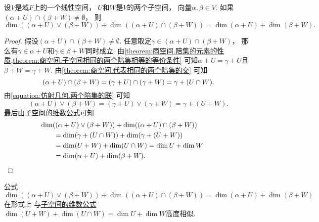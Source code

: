 \begin{theorem}
设\(V\)是域\(F\)上的一个线性空间，
\(U\)和\(W\)是\(V\)的两个子空间，
向量\(\alpha,\beta \in V\).
如果\((\alpha + U) \cap (\beta + W) \neq \emptyset\)，
则\begin{equation*}
	\dim((\alpha + U) \vee (\beta + W))
	+ \dim((\alpha + U) \cap (\beta + W))
	= \dim(\alpha + U)
	+ \dim(\beta + W).
\end{equation*}
\begin{proof}
假设\((\alpha + U) \cap (\beta + W) \neq \emptyset\).
任意取定\(\gamma \in (\alpha + U) \cap (\beta + W)\)，
那么有\(\gamma \in \alpha + U\)和\(\gamma \in \beta + W\)同时成立.
由\cref{theorem:商空间.陪集的元素的性质,theorem:商空间.子空间相同的两个陪集相等的等价条件}
可知\(\alpha + U = \gamma + U\)且\(\beta + W = \gamma + W\).
由\cref{theorem:商空间.代表相同的两个陪集的交}
可知\begin{equation*}
	(\alpha + U) \cap (\beta + W)
	= (\gamma + U) \cap (\gamma + W) \\
	= \gamma + (U \cap W).
\end{equation*}
由\cref{equation:仿射几何.两个陪集的联}
可知\begin{equation*}
	(\alpha + U) \vee (\beta + W)
	= (\gamma + U) \vee (\gamma + W)
	= \gamma + (U + W).
\end{equation*}
最后由\hyperref[theorem:线性空间.子空间.子空间的维数公式]{子空间的维数公式}可知\begin{align*}
	&\hspace{-20pt}
	\dim((\alpha + U) \vee (\beta + W))
		+ \dim((\alpha + U) \cap (\beta + W)) \\
	&= \dim(\gamma + (U \cap W))
		+ \dim(\gamma + (U + W)) \\
	&= \dim(U + W)
		+ \dim(U \cap W)
	= \dim U + \dim W \\
	&= \dim(\alpha + U) + \dim(\beta + W).
	\qedhere
\end{align*}
\end{proof}
\end{theorem}
\begin{remark}
公式\(
	\dim((\alpha + U) \vee (\beta + W))
	+ \dim((\alpha + U) \cap (\beta + W))
	= \dim(\alpha + U)
	+ \dim(\beta + W)
\)
在形式上
与\hyperref[theorem:线性空间.子空间.子空间的维数公式]{子空间的维数公式}
\(
	\dim(U + W)
	+ \dim(U \cap W)
	= \dim U + \dim W
\)高度相似.
\end{remark}

